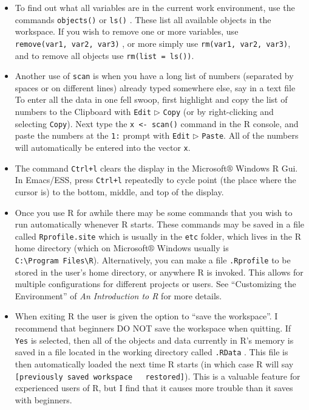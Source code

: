 \documentclass[]{book}
\providecommand{\tightlist}{%
  \setlength{\itemsep}{0pt}\setlength{\parskip}{0pt}}
\numberwithin{equation}{chapter}
\numberwithin{figure}{chapter}
\theoremstyle{plain}
\theoremstyle{definition}
\theoremstyle{remark}
\theoremstyle{definition}
\theoremstyle{definition}
\theoremstyle{remark}
\begin{document}
\begin{itemize}
\tightlist
\item
  To find out what all variables are in the current work environment,
  use the commands \texttt{objects()} 
  or \texttt{ls()} . These list all available
  objects in the workspace. If you wish to remove one or more variables,
  use \texttt{remove(var1,\ var2,\ var3)}
  , or more simply use
  \texttt{rm(var1,\ var2,\ var3)}, and to remove all objects use
  \texttt{rm(list\ =\ ls())}.
\item
  Another use of \texttt{scan} is when you have a long list of numbers
  (separated by spaces or on different lines) already typed somewhere
  else, say in a text file To enter all the data in one fell swoop,
  first highlight and copy the list of numbers to the Clipboard with
  \texttt{Edit} \(\triangleright\) \texttt{Copy} (or by right-clicking
  and selecting \texttt{Copy}). Next type the
  \texttt{x\ \textless{}-\ scan()} command in the R console, and paste
  the numbers at the \texttt{1:} prompt with \texttt{Edit}
  \(\triangleright\) \texttt{Paste}. All of the numbers will
  automatically be entered into the vector \texttt{x}.
\item
  The command \texttt{Ctrl+l} clears the display in the
  Microsoft\(\circledR\) Windows R Gui. In Emacs/ESS, press
  \texttt{Ctrl+l} repeatedly to cycle point (the place where the cursor
  is) to the bottom, middle, and top of the display.
\item
  Once you use R for awhile there may be some commands that you wish to
  run automatically whenever R starts. These commands may be saved in a
  file called \texttt{Rprofile.site}
   which is usually in the
  \texttt{etc} folder, which lives in the R home directory (which on
  Microsoft\(\circledR\) Windows usually is
  \texttt{C:\textbackslash{}Program\ Files\textbackslash{}R}).
  Alternatively, you can make a file \texttt{.Rprofile}
   to be stored in the user's home
  directory, or anywhere R is invoked. This allows for multiple
  configurations for different projects or users. See ``Customizing the
  Environment'' of \emph{An Introduction to R} for more details.
\item
  When exiting R the user is given the option to ``save the workspace''.
  I recommend that beginners DO NOT save the workspace when quitting. If
  \texttt{Yes} is selected, then all of the objects and data currently
  in R's memory is saved in a file located in the working directory
  called \texttt{.RData} . This file is
  then automatically loaded the next time R starts (in which case R will
  say \texttt{{[}previously\ saved\ workspace\ \ \ restored{]}}). This
  is a valuable feature for experienced users of R, but I find that it
  causes more trouble than it saves with beginners.
\end{itemize}
\end{document}
